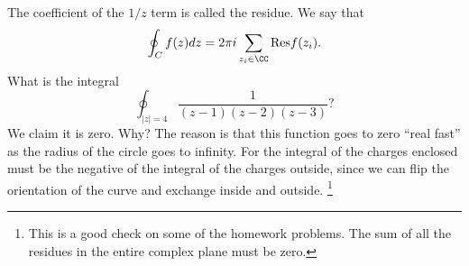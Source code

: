 The coefficient of the $1/z$ term is called the residue. We say that
\begin{equation}
    \oint_C f(z) dz = 2\pi i \sum_{z_i \in \CC} \text{Res} f(z_i).
\end{equation}
What is the integral
\begin{equation}
    \oint_{|z|=4} \frac{1}{(z-1)(z-2)(z-3)}?
\end{equation}
We claim it is zero. Why? The reason is that this function goes to zero ``real fast'' as the radius of the circle goes to infinity. For the integral of the charges enclosed must be the negative of the integral of the charges outside, since we can flip the orientation of the curve and exchange inside and outside.%
    \footnote{This is a good check on some of the homework problems. The sum of all the residues in the entire complex plane must be zero.}